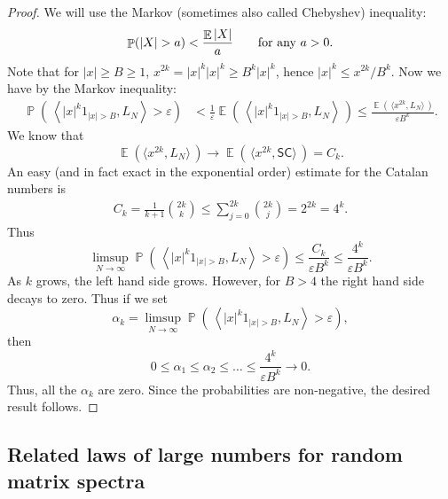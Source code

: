 \documentclass[letterpaper,11pt,oneside,reqno]{amsart}
\numberwithin{equation}{section}
\newcommand{\SC}{\mathsf{SC}}
\DeclareMathOperator{\EE}{\mathbb{E}}
\DeclareMathOperator{\PP}{\mathbb{P}}
\theoremstyle{definition}
\begin{document}
\begin{proof}
	We will use the Markov (sometimes also called Chebyshev) inequality:
	\begin{equation*}
	\PP (  | X | > a ) < \frac{ \EE | X |  }{ a }\qquad \textnormal{for any $a>0$}.
	\end{equation*}
	Note that for $ | x | \ge B \ge 1 $,
	$x^{2k}=|x|^{k}|x|^{k}\ge B^{k}|x|^{k}$, hence
	$ | x |^k \le x^{ 2 k } / B^k $.  Now we have by the Markov inequality:
	\begin{align*}
	\PP \left( \, \left \langle | x |^k 1_{ | x | > B } , L_N \right \rangle > \varepsilon \right) &< \frac{ 1 }{ \varepsilon } \EE \left( \, \left \langle | x |^k 1_{ | x | > B } , L_N \right \rangle \, \right) \le \frac{ \EE \left( \, \langle x^{ 2k } , L_N \rangle \, \right) }{ \varepsilon B^k }.
	\end{align*}
	We know that
	\begin{equation*}
	\EE \left( \langle x^{2k} , L_N \rangle \, \right) \to \EE \left( \, \langle x^{ 2k } , \SC \rangle \, \right) = C_k.
	\end{equation*}
	An easy (and in fact exact in the exponential order) 
	estimate for the Catalan numbers is
	\begin{align*}
	C_k=\frac{1}{k+1}\binom{2k}{k} \le \sum_{ j = 0 }^{ 2k } \binom{2k}{j} = 2^{2k} = 4^k.
	\end{align*}
	Thus
	\begin{equation*}
	\limsup_{ N \to \infty } \PP \left( \, \left \langle | x |^k 1_{ | x | > B } , L_N \right \rangle > \varepsilon \right) \le \frac{ C_k }{ \varepsilon B^k } \le \frac{ 4^k }{ \varepsilon B^k }.
	\end{equation*}
	As $ k $ grows, the left hand side grows. However, for $ B > 4 $ the right hand side decays to zero. Thus if we set
	\begin{equation*}
	\alpha_k = \limsup_{ N \to \infty } \PP \left( \, \left \langle | x |^k 1_{ | x | > B } , L_N \right \rangle > \varepsilon \right),
	\end{equation*}
	then
	$$
	0 \le \alpha_1 \le \alpha_2 \le \ldots \le \frac{ 4^k }{ \varepsilon B^k } \to 0.
	$$
	Thus, all the $ \alpha_k $ are zero. Since the probabilities are non-negative, the desired result follows.
\end{proof}






\subsection{Related laws of large numbers for random matrix spectra} %
\label{sub:remarks_on_the_semicircle_law_for_real_wigner_matrices}
\end{document}
